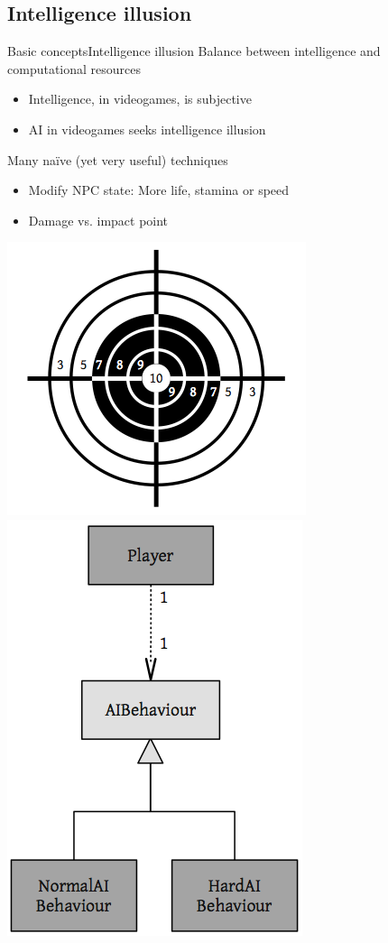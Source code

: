 \documentclass[10pt,compress]{beamer} %
\begin{document}
\subsection{Intelligence illusion}
\begin{frame}{Basic concepts}{Intelligence illusion}
	Balance between intelligence and computational resources
  	\begin{itemize}
		\item Intelligence, in videogames, is subjective
		\item AI in videogames seeks \alert{intelligence illusion}
	\end{itemize}
	Many na\"ive (yet very useful) techniques
	\begin{itemize}
		\item Modify NPC state: More life, stamina or speed
		\item Damage vs. impact point
	\end{itemize}
	\begin{center}
		\includegraphics[width=0.2\linewidth]{figs/diana}
		\vspace{1cm}
		\includegraphics[width=0.15\linewidth]{figs/halo}
	\end{center}
\end{frame}
\end{document}
